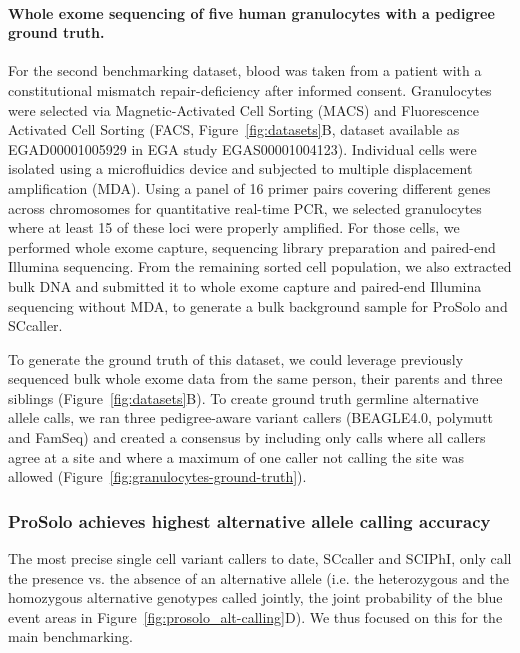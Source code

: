 \documentclass[12pt,inline]{wlscirep}
\begin{document}
\paragraph{Whole exome sequencing of five human granulocytes with a pedigree ground truth.}
For the second benchmarking dataset, blood was taken from a patient with a constitutional mismatch repair-deficiency\cite{hoell_constitutional_2014} after informed consent.
Granulocytes were selected via Magnetic-Activated Cell Sorting (MACS) and Fluorescence Activated Cell Sorting (FACS, Figure~\ref{fig:datasets}B, dataset available as \mbox{EGAD00001005929} in EGA study \mbox{EGAS00001004123}).
Individual cells were isolated using a microfluidics device and subjected to multiple displacement amplification (MDA).
Using a panel of 16 primer pairs covering different genes across chromosomes for quantitative real-time PCR, we selected granulocytes where at least 15 of these loci were properly amplified.
For those cells, we performed whole exome capture, sequencing library preparation and paired-end Illumina sequencing.
From the remaining sorted cell population, we also extracted bulk DNA and submitted it to whole exome capture and paired-end Illumina sequencing without MDA, to generate a bulk background sample for ProSolo and SCcaller.

To generate the ground truth of this dataset, we could leverage previously sequenced bulk whole exome data from the same person, their parents and three siblings \cite{hoell_constitutional_2014} (Figure~\ref{fig:datasets}B).
To create ground truth germline alternative allele calls, we ran three pedigree-aware variant callers (BEAGLE4.0\cite{browning_improving_2013}, polymutt\cite{li_likelihood-based_2012} and FamSeq\cite{peng_rare_2013,peng_famseq:_2014}) and created a consensus by including only calls where all callers agree at a site and where a maximum of one caller not calling the site was allowed (Figure~\ref{fig:granulocytes-ground-truth}).

\subsubsection{ProSolo achieves highest alternative allele calling accuracy}

The most precise single cell variant callers to date, SCcaller and SCIPhI, only call the presence vs. the absence of an alternative allele (i.e. the heterozygous and the homozygous alternative genotypes called jointly, the joint probability of the blue event areas in Figure~\ref{fig:prosolo_alt-calling}D).
We thus focused on this for the main benchmarking.
\end{document}

